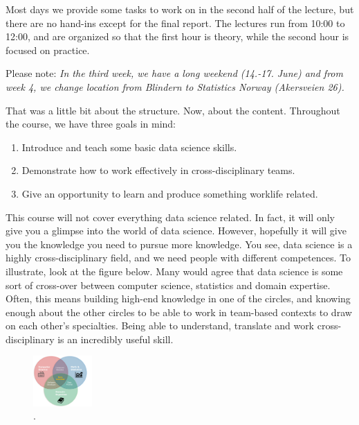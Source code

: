 \documentclass[
]{article}
\providecommand{\tightlist}{%
  \setlength{\itemsep}{0pt}\setlength{\parskip}{0pt}}
\begin{document}
Most days we provide some tasks to work on in the second half of the
lecture, but there are no hand-ins except for the final report. The
lectures run from 10:00 to 12:00, and are organized so that the first
hour is theory, while the second hour is focused on practice.

Please note: \emph{In the third week, we have a long weekend (14.-17.
June) and from week 4, we change location from Blindern to Statistics
Norway (Akersveien 26).}

\hfill\break

That was a little bit about the structure. Now, about the content.
Throughout the course, we have three goals in mind:

\begin{enumerate}
\def\labelenumi{\arabic{enumi}.}
\tightlist
\item
  Introduce and teach some basic data science skills.
\item
  Demonstrate how to work effectively in cross-disciplinary teams.
\item
  Give an opportunity to learn and produce something worklife related.
\end{enumerate}

This course will not cover everything data science related. In fact, it
will only give you a glimpse into the world of data science. However,
hopefully it will give you the knowledge you need to pursue more
knowledge. You see, data science is a highly cross-disciplinary field,
and we need people with different competences. To illustrate, look at
the figure below. Many would agree that data science is some sort of
cross-over between computer science, statistics and domain expertise.
Often, this means building high-end knowledge in one of the circles, and
knowing enough about the other circles to be able to work in team-based
contexts to draw on each other's specialties. Being able to understand,
translate and work cross-disciplinary is an incredibly useful skill.

\begin{figure}
\centering
\includegraphics[width=0.2\textwidth,height=\textheight]{./scripts/figures/datascience_figure.png}
\caption{.}
\end{figure}
\end{document}
